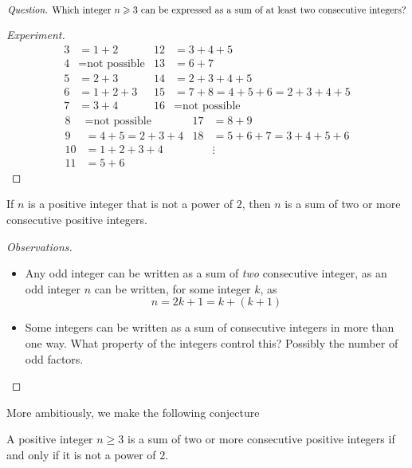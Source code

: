 \begin{example}
\[\text{\emph{Question.} Which integer $n \geq 3$ can be expressed as a sum of at least two consecutive integers?}\]
\begin{proof}[Experiment]\renewcommand{\qed}{}
\begin{align*}
3 &= 1 + 2					& 12 &= 3 + 4 + 5\\[0.5em]
4 &= \text{not possible} 	& 13 &= 6 + 7\\[0.5em]
5 &= 2 + 3					& 14 &= 2 + 3 + 4 + 5\\[0.5em]
6 &= 1 + 2 + 3 				& 15 &= 7 + 8 = 4 + 5 + 6 = 2 + 3 + 4 + 5\\[0.5em]
7 &= 3 + 4					& 16 &= \text{not possible}
\end{align*}
\begin{align*}
8 &= \text{not possible}		& 17 &= 8 + 9\\[0.5em]
9 &= 4 + 5 = 2 + 3 + 4		& 18 &= 5 + 6 + 7 = 3 + 4 + 5 + 6\\
10 &= 1 + 2 + 3 + 4		 	& &\vdots\\[0.5em]
11 &= 5 + 6					
\end{align*}
\end{proof}

\vspace*{0.5em}

\begin{conjecture}\label{consec-conj}
If $n$ is a positive integer that is not a power of $2$, then $n$ is a sum of two or more consecutive positive integers.
\end{conjecture}

\vspace*{1em}

\begin{proof}[Observations]\renewcommand{\qed}{}\hfill
\begin{itemize}
\item Any odd integer can be written as a sum of \emph{two} consecutive integer, as an odd integer $n$ can be written, for some integer $k$, as
\[n = 2k + 1 = k + (k + 1)\]
\item Some integers can be written as a sum of consecutive integers in more than one way. What property of the integers control this? Possibly the number of odd factors.
\end{itemize}
\end{proof}

\vspace*{1em}

More ambitiously, we make the following conjecture
\begin{conjecture}\label{consec-conj-impr}
A positive integer $n \geq 3$ is a sum of two or more consecutive positive integers if and only if it is not a power of $2$.
\end{conjecture}


\end{example}
